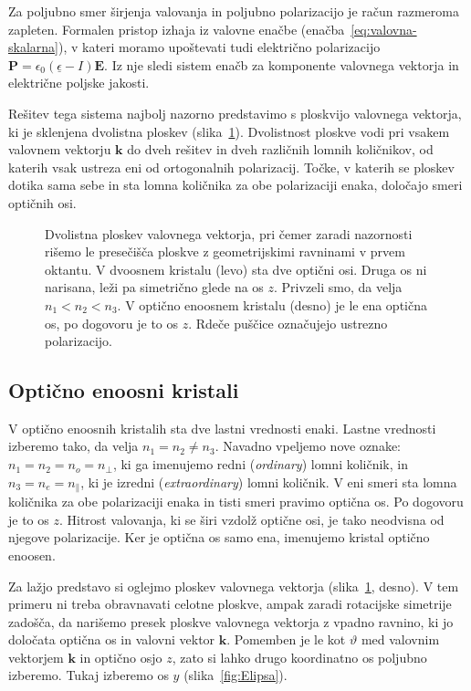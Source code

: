 Za poljubno smer širjenja valovanja in poljubno polarizacijo je račun razmeroma zapleten. 
Formalen pristop izhaja iz valovne enačbe (enačba~\ref{eq:valovna-skalarna}), v kateri
moramo upoštevati tudi električno polarizacijo 
$\mathbf{P} = \epsilon_{0}(\underline{\epsilon}-I)\mathbf{E}$. Iz nje sledi 
sistem enačb za komponente valovnega vektorja in električne poljske jakosti. 

Rešitev tega sistema najbolj nazorno predstavimo s ploskvijo valovnega vektorja, 
ki je sklenjena dvolistna ploskev (slika~\ref{kploskev}). Dvolistnost ploskve
vodi pri vsakem valovnem vektorju $\mathbf{k}$ do dveh rešitev in dveh različnih lomnih
količnikov, od katerih vsak ustreza eni od ortogonalnih polarizacij. Točke, v katerih
se ploskev dotika sama sebe in sta lomna količnika za obe polarizaciji enaka, 
določajo smeri optičnih osi. 
\begin{figure}[h]
\centering
\def\svgwidth{140truemm} 

\caption{Dvolistna ploskev valovnega vektorja, pri čemer zaradi nazornosti rišemo le presečišča
ploskve z geometrijskimi ravninami v prvem oktantu. 
V dvoosnem kristalu (levo) sta dve optični osi. Druga os ni narisana, leži pa 
simetrično glede na os $z$. Privzeli smo, da velja $n_1<n_2<n_3$.
V optično enoosnem kristalu (desno) je le ena optična os, 
po dogovoru je to os $z$. Rdeče puščice označujejo ustrezno polarizacijo.}
\label{kploskev}
\end{figure}

\subsection*{Optično enoosni kristali}
V optično enoosnih kristalih sta dve lastni vrednosti enaki. Lastne vrednosti izberemo
tako, da velja $n_{1}=n_{2}\neq n_{3}$. Navadno vpeljemo nove 
oznake: $n_{1}=n_{2}=n_{o}=n_{\perp}$, ki ga imenujemo redni (\textit{ordinary})
lomni količnik, in $n_{3}=n_{e}=n_\parallel$, ki je izredni 
(\textit{extraordinary}) lomni količnik. 
V eni smeri sta lomna količnika za obe polarizaciji enaka in tisti smeri pravimo 
optična os. Po dogovoru je to os $z$. Hitrost valovanja, ki
se širi vzdolž optične osi, je tako neodvisna od njegove polarizacije.
Ker je optična os samo ena, imenujemo kristal optično enoosen. 

Za lažjo predstavo si oglejmo ploskev valovnega vektorja (slika~\ref{kploskev}, desno). 
V tem primeru ni treba obravnavati celotne ploskve, ampak zaradi rotacijske simetrije
zadošča, da narišemo presek ploskve valovnega vektorja z vpadno ravnino, ki jo določata 
optična os in valovni vektor $\mathbf{k}$. 
Pomemben je le kot $\vartheta$ med valovnim vektorjem $\mathbf{k}$ 
in optično osjo $z$, zato si lahko drugo koordinatno os poljubno izberemo. Tukaj izberemo
os $y$ (slika~\ref{fig:Elipsa}). 

